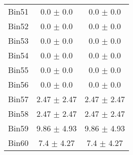 \begin{tabular}{|c|c|c|}
     Bin51 & 0.0 $\pm$ 0.0 & 0.0 $\pm$ 0.0 \\ \cline{1-3} 
     Bin52 & 0.0 $\pm$ 0.0 & 0.0 $\pm$ 0.0 \\ \cline{1-3} 
     Bin53 & 0.0 $\pm$ 0.0 & 0.0 $\pm$ 0.0 \\ \cline{1-3} 
     Bin54 & 0.0 $\pm$ 0.0 & 0.0 $\pm$ 0.0 \\ \cline{1-3} 
     Bin55 & 0.0 $\pm$ 0.0 & 0.0 $\pm$ 0.0 \\ \cline{1-3} 
     Bin56 & 0.0 $\pm$ 0.0 & 0.0 $\pm$ 0.0 \\ \cline{1-3} 
     Bin57 & 2.47 $\pm$ 2.47 & 2.47 $\pm$ 2.47 \\ \cline{1-3} 
     Bin58 & 2.47 $\pm$ 2.47 & 2.47 $\pm$ 2.47 \\ \cline{1-3} 
     Bin59 & 9.86 $\pm$ 4.93 & 9.86 $\pm$ 4.93 \\ \cline{1-3} 
     Bin60 & 7.4 $\pm$ 4.27 & 7.4 $\pm$ 4.27 \\ \cline{1-3} 
  \end{tabular}
